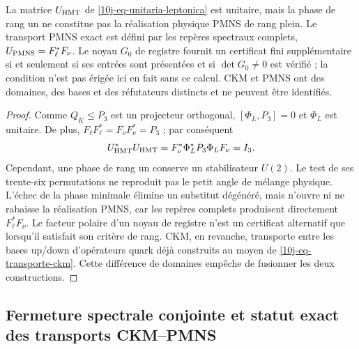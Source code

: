 \begin{proposition}
\label{10j-prop-ckm-pmns}
La matrice \(U_{\rm HMT}\) de \eqref{10j-eq-unitaria-leptonica} est unitaire, mais la phase de rang un ne constitue pas la réalisation physique PMNS de rang plein. Le transport PMNS exact est défini par les repères spectraux complets, \(U_{\rm PMNS}=F_\ell^*F_\nu\). Le noyau \(G_0\) de registre fournit un certificat fini supplémentaire si et seulement si ses entrées sont présentées et si \(\det G_0\ne0\) est vérifié ; la condition n'est pas érigée ici en fait sans ce calcul. CKM et PMNS ont des domaines, des bases et des réfutateurs distincts et ne peuvent être identifiés.
\end{proposition}

\begin{proof}
Comme \(Q_K\leq P_3\) est un projecteur orthogonal, \([\Phi_L,P_3]=0\) et \(\Phi_L\) est unitaire. De plus, \(F_\ell F_\ell^*=F_\nu F_\nu^*=P_3\) ; par conséquent
\[
 U_{\rm HMT}^*U_{\rm HMT}
 =F_\nu^*\Phi_L^*P_3\Phi_LF_\nu=I_3.
\]
Cependant, une phase de rang un conserve un stabilisateur \(U(2)\). Le test de ses trente-six permutations ne reproduit pas le petit angle de mélange physique. L'échec de la phase minimale élimine un substitut dégénéré, mais n'ouvre ni ne rabaisse la réalisation PMNS, car les repères complets produisent directement \(F_\ell^*F_\nu\). Le facteur polaire d'un noyau de registre n'est un certificat alternatif que lorsqu'il satisfait son critère de rang. CKM, en revanche, transporte entre les bases up/down d'opérateurs quark déjà construits au moyen de \eqref{10j-eq-transporte-ckm}. Cette différence de domaines empêche de fusionner les deux constructions.
\end{proof}

\subsection{Fermeture spectrale conjointe et statut exact des transports CKM--PMNS}
\label{10j-sec-cierre-espectral-mezclas}

